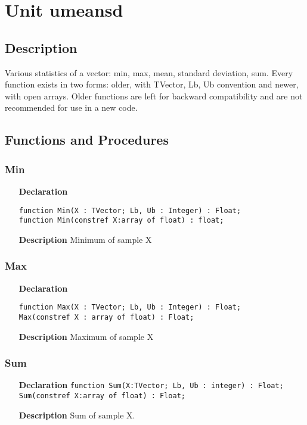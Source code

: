 \documentclass[12pt,a4paper,oneside]{report}
\newcommand{\lmath}[1]{   %
	\marginpar{\vspace{#1} 
		\begin{flushright}
			LMath
	\end{flushright} }
}
\newcommand{\declarationitem}[1]{\textbf{#1}}
\newcommand{\descriptiontitle}[1]{\textbf{#1}}
\newcommand{\code}[1]{\texttt{#1}}
\begin{document}
\section{Unit umeansd}
\label{umeansd}
\subsection{Description}
Various statistics of a vector: min, max, mean, standard deviation, sum. Every function exists in two forms: older, with TVector, Lb, Ub convention and newer, with open arrays. Older functions are left for backward compatibility and are not recommended for use in a new code.
\subsection{Functions and Procedures}
\subsubsection{Min}
\label{umeansd-Min}
\begin{itemize}\item[\declarationitem{Declaration}\hfill]
	\begin{flushleft}
		\code{function Min(X : TVector; Lb, Ub : Integer) : Float;}\\
		\code{function Min(constref X:array of float) : float;}
	\end{flushleft}
	\item[\descriptiontitle{Description}]
	Minimum of sample X
\end{itemize}
\subsubsection{Max}
\label{umeansd-Max}
\begin{itemize}\item[\declarationitem{Declaration}\hfill]
	\begin{flushleft}
		\code{function Max(X : TVector; Lb, Ub : Integer) : Float;}\\
		\code{Max(constref X : array of float) : Float;}
	\end{flushleft}
	\item[\descriptiontitle{Description}]
	Maximum of sample X
\end{itemize}
\subsubsection{Sum}\label{umeansd-sum} \lmath{-24pt}
\begin{itemize}
	\item[\declarationitem{Declaration}\hfill]
	\code{function Sum(X:TVector; Lb, Ub : integer) : Float;}\\
	\code{Sum(constref X:array of float) : Float;}
	\item[\descriptiontitle{Description}]
	Sum of sample X.
\end{itemize}
\end{document}
